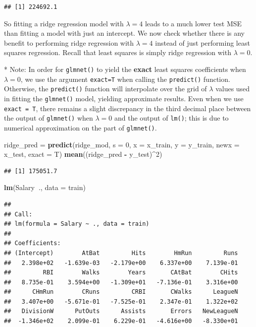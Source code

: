 \documentclass[openany]{book}
\newenvironment{Shaded}{\begin{snugshade}}{\end{snugshade}}
\newcommand{\DataTypeTok}[1]{\textcolor[rgb]{0.13,0.29,0.53}{#1}}
\newcommand{\DecValTok}[1]{\textcolor[rgb]{0.00,0.00,0.81}{#1}}
\newcommand{\KeywordTok}[1]{\textcolor[rgb]{0.13,0.29,0.53}{\textbf{#1}}}
\newcommand{\NormalTok}[1]{#1}
\newcommand{\OperatorTok}[1]{\textcolor[rgb]{0.81,0.36,0.00}{\textbf{#1}}}
\newcommand{\StringTok}[1]{\textcolor[rgb]{0.31,0.60,0.02}{#1}}
\begin{document}
\begin{verbatim}
## [1] 224692.1
\end{verbatim}

So fitting a ridge regression model with \(\lambda = 4\) leads to a much lower test
MSE than fitting a model with just an intercept. We now check whether
there is any benefit to performing ridge regression with \(\lambda = 4\) instead of
just performing least squares regression. Recall that least squares is simply
ridge regression with \(\lambda = 0\).

* Note: In order for \texttt{glmnet()} to yield the \textbf{exact} least squares coefficients when \(\lambda = 0\),
we use the argument \texttt{exact=T} when calling the \texttt{predict()} function. Otherwise, the
\texttt{predict()} function will interpolate over the grid of \(\lambda\) values used in fitting the
\texttt{glmnet()} model, yielding approximate results. Even when we use \texttt{exact\ =\ T}, there remains
a slight discrepancy in the third decimal place between the output of \texttt{glmnet()} when
\(\lambda = 0\) and the output of \texttt{lm()}; this is due to numerical approximation on the part of
\texttt{glmnet()}.

\begin{Shaded}
\begin{Highlighting}[]
\NormalTok{ridge_pred =}\StringTok{ }\KeywordTok{predict}\NormalTok{(ridge_mod, }\DataTypeTok{s =} \DecValTok{0}\NormalTok{, }\DataTypeTok{x =}\NormalTok{ x_train, }\DataTypeTok{y =}\NormalTok{ y_train, }\DataTypeTok{newx =}\NormalTok{ x_test, }\DataTypeTok{exact =}\NormalTok{ T)}
\KeywordTok{mean}\NormalTok{((ridge_pred }\OperatorTok{-}\StringTok{ }\NormalTok{y_test)}\OperatorTok{^}\DecValTok{2}\NormalTok{)}
\end{Highlighting}
\end{Shaded}

\begin{verbatim}
## [1] 175051.7
\end{verbatim}

\begin{Shaded}
\begin{Highlighting}[]
\KeywordTok{lm}\NormalTok{(Salary}\OperatorTok{~}\NormalTok{., }\DataTypeTok{data =}\NormalTok{ train)}
\end{Highlighting}
\end{Shaded}

\begin{verbatim}
## 
## Call:
## lm(formula = Salary ~ ., data = train)
## 
## Coefficients:
## (Intercept)        AtBat         Hits        HmRun         Runs  
##   2.398e+02   -1.639e-03   -2.179e+00    6.337e+00    7.139e-01  
##         RBI        Walks        Years       CAtBat        CHits  
##   8.735e-01    3.594e+00   -1.309e+01   -7.136e-01    3.316e+00  
##      CHmRun        CRuns         CRBI       CWalks      LeagueN  
##   3.407e+00   -5.671e-01   -7.525e-01    2.347e-01    1.322e+02  
##   DivisionW      PutOuts      Assists       Errors   NewLeagueN  
##  -1.346e+02    2.099e-01    6.229e-01   -4.616e+00   -8.330e+01
\end{verbatim}
\end{document}

